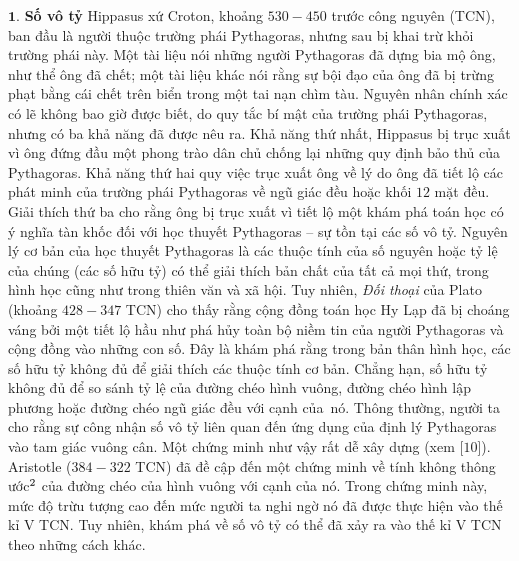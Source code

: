 \begin{multicols}{2}
	$\pmb{1.}$ \textbf{\color{lichsutoanhoc}Số vô tỷ}
	\vskip 0.05cm
	Hippasus xứ Croton, khoảng $530-450$ trước công nguyên (TCN), ban đầu là người thuộc trường phái Pythagoras, nhưng sau bị khai trừ khỏi trường phái này. Một tài liệu nói những người Pythagoras đã dựng bia mộ ông, như thể ông đã chết; một tài liệu khác nói rằng sự bội đạo của ông đã bị trừng phạt bằng cái chết trên biển trong một tai nạn chìm tàu. Nguyên nhân chính xác có lẽ không bao giờ được biết, do quy tắc bí mật của trường phái Pythagoras, nhưng có ba khả năng đã được nêu ra. 
	\vskip 0.05cm
	Khả năng thứ nhất, Hippasus bị trục xuất vì ông đứng đầu một phong trào dân chủ chống lại những quy định bảo thủ của Pythagoras.
	\vskip 0.05cm
	Khả năng thứ hai quy việc trục xuất ông về lý do ông đã tiết lộ các phát minh của trường phái Pythagoras về ngũ giác đều hoặc khối $12$ mặt đều. 
	\vskip 0.05cm
	Giải thích thứ ba cho rằng ông bị trục xuất vì tiết lộ một khám phá toán học có ý nghĩa tàn khốc đối với học thuyết Pythagoras -- sự tồn tại các số vô tỷ.
	\vskip 0.1cm
	Nguyên lý cơ bản của học thuyết Pythagoras là các thuộc tính của số nguyên hoặc tỷ lệ của chúng (các số hữu tỷ) có thể giải thích bản chất của tất cả mọi thứ, trong hình học cũng như trong thiên văn và xã hội. Tuy nhiên, \textit{Đối thoại} của Plato (khoảng $428-347$ TCN) cho thấy rằng cộng đồng toán học Hy Lạp đã bị choáng váng bởi một tiết lộ hầu như phá hủy toàn bộ niềm tin của người Pythagoras và cộng đồng vào những con số. Đây là khám phá rằng trong bản  thân hình học, các số hữu tỷ không đủ để giải thích các thuộc tính cơ bản. Chẳng hạn, số hữu tỷ không đủ để so sánh tỷ lệ của đường chéo hình vuông, đường chéo hình lập phương hoặc đường chéo ngũ giác đều với cạnh của~nó. 
	\vskip 0.1cm
	Thông thường, người ta cho rằng sự công nhận số vô tỷ liên quan đến ứng dụng của định lý Pythagoras vào tam giác vuông cân. Một chứng minh như vậy rất dễ xây dựng (xem [$10$]). Aristotle ($384-322$ TCN) đã đề cập đến một chứng minh về tính không thông ước$^{\small2}$ của đường chéo của hình vuông với cạnh của nó. Trong chứng minh này, mức độ trừu tượng cao đến mức người ta nghi ngờ nó đã được thực hiện vào thế kỉ V TCN. Tuy nhiên,  khám phá về số vô tỷ có thể đã xảy ra vào thế kỉ V TCN theo những cách khác. 
	\vskip 0.1cm

\end{multicols}
